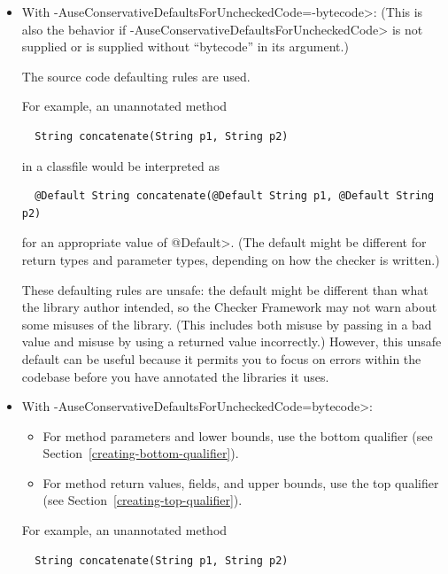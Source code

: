 \begin{itemize}
\item With \<-AuseConservativeDefaultsForUncheckedCode=-bytecode>:
(This is also the behavior if
\<-AuseConservativeDefaultsForUncheckedCode> is not supplied or is supplied
without ``bytecode'' in its argument.)

The source code defaulting rules are used.

For example, an unannotated method

\begin{Verbatim}
  String concatenate(String p1, String p2)
\end{Verbatim}

\noindent
in a classfile would be interpreted as

\begin{Verbatim}
  @Default String concatenate(@Default String p1, @Default String p2)
\end{Verbatim}

\noindent
for an appropriate value of \<@Default>.  (The default might be different for
return types and parameter types, depending on how the checker is written.)

These defaulting rules are unsafe:  the default might be different than
what the library author intended, so the Checker Framework may not warn
about some misuses of the library.  (This includes both misuse by passing
in a bad value and misuse by using a returned value incorrectly.)  However,
this unsafe default can be useful because it permits you to focus on errors
within the codebase before you have annotated the libraries it uses.


\item With \<-AuseConservativeDefaultsForUncheckedCode=bytecode>:

\begin{itemize}
\item
  For method parameters and lower bounds, use the bottom qualifier (see
  Section~\ref{creating-bottom-qualifier}).
\item
  For method return values, fields, and upper bounds, use the top qualifier (see
  Section~\ref{creating-top-qualifier}).
\end{itemize}

For example, an unannotated method

\begin{Verbatim}
  String concatenate(String p1, String p2)
\end{Verbatim}


\end{itemize}
